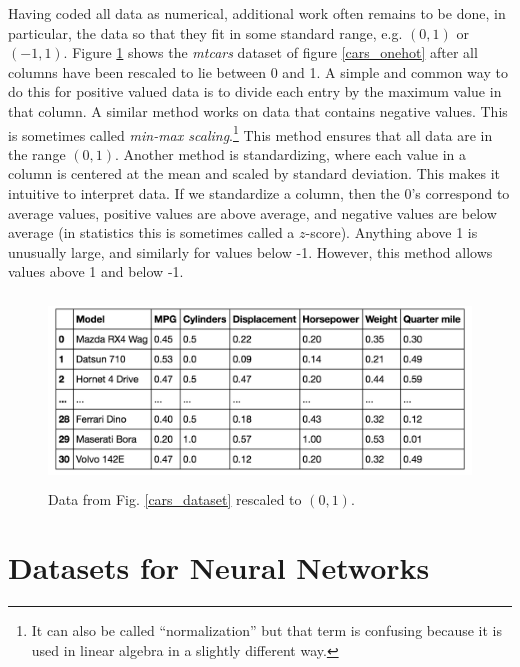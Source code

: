 Having coded all data as numerical, additional work often remains to be done, in particular,  the data so that they fit in some standard range, e.g. $(0,1)$ or $(-1,1)$. Figure \ref{cars_dataset_scaled} shows the \emph{mtcars} dataset of figure \ref{cars_onehot} after all columns have been rescaled to lie between 0 and 1. A simple and common way to do this for positive valued data is to divide each entry by the maximum value in that column. A similar method works on data that contains negative values. This is sometimes called \emph{min-max scaling}.\footnote{It can also be called ``normalization'' but that term is confusing because it is used in linear algebra in a slightly different way.} This method ensures that all data are in the range  $(0,1)$. Another method is standardizing, where each value in a column is centered at the mean and scaled by standard deviation. This makes it intuitive to interpret data. If we standardize a column, then the 0's correspond to average values, positive values are above average, and negative values are below average (in statistics this is sometimes called a $z$-score). Anything above 1 is unusually large, and similarly for values below -1. However, this method allows values above 1 and below -1. 

\begin{figure}[h]
\centering
\includegraphics[height=50mm]{./images/CarsScaled.png}
\caption[Screenshot of Motor Trend Car Road Tests dataset included with R.]{Data from Fig. \ref{cars_dataset} rescaled to $(0,1)$.}
\label{cars_dataset_scaled}
\end{figure}

\section{Datasets for Neural Networks}\label{datasets}

